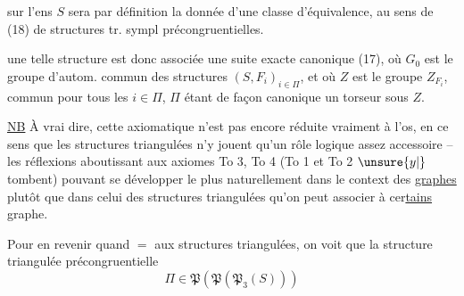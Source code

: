 
sur l'ens $S$ sera par définition la donnée d'une classe d'équivalence\inserted{ $\Pi$}, au sens de (18) de structures tr. sympl précongruentielles.


 une telle structure est donc associée une suite exacte canonique (17), où $G_0$ est le groupe d'autom. commun des structures $(S,F_i)_{i\in\Pi}$, et où $Z$ est le groupe $Z_{F_i}$, commun pour tous les $i\in\Pi$, $\Pi$ étant de façon canonique un torseur sous $Z$.

\uline{NB} À vrai dire, cette axiomatique n'est pas encore réduite vraiment à l'os, en ce sens que les structures triangulées n'y jouent qu'un rôle logique assez accessoire -- les réflexions aboutissant aux axiomes To 3, To 4 (To 1 et To 2 $\unsure{y|{}}$ tombent) pouvant se développer le plus naturellement dans le context des \uline{graphes} plutôt que dans celui des structures triangulées qu'on peut associer à cer\uline{tains} graphe.

Pour en revenir quand $=$ aux structures triangulées, on voit que la structure triangulée précongruentielle
\[
\Pi\in\mathfrak P(\mathfrak P(\mathfrak P_3(S)))\tag*{(19)}
\]


